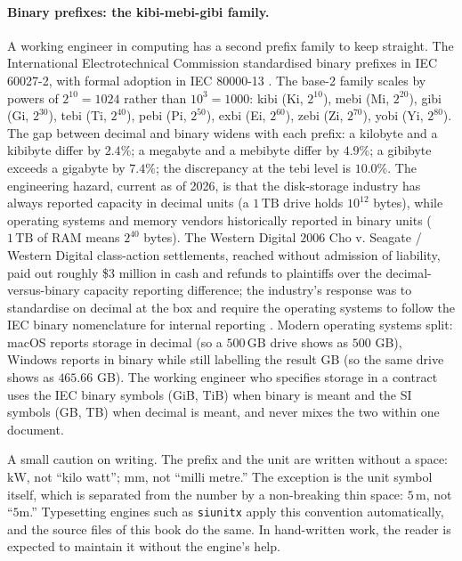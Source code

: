 \paragraph{Binary prefixes: the kibi-mebi-gibi family.}
A working engineer in computing has a second prefix family to keep
straight. The International Electrotechnical Commission standardised
binary prefixes in IEC 60027-2, with formal adoption in IEC 80000-13
\cite{std:ch02t3b-iec-80000-13}. The base-2 family scales by powers
of $2^{10} = 1024$ rather than $10^{3} = 1000$: kibi (Ki, $2^{10}$),
mebi (Mi, $2^{20}$), gibi (Gi, $2^{30}$), tebi (Ti, $2^{40}$), pebi
(Pi, $2^{50}$), exbi (Ei, $2^{60}$), zebi (Zi, $2^{70}$), yobi
(Yi, $2^{80}$). The gap between decimal and binary widens with each
prefix: a kilobyte and a kibibyte differ by $2.4\%$; a megabyte and
a mebibyte differ by $4.9\%$; a gibibyte exceeds a gigabyte by
$7.4\%$; the discrepancy at the tebi level is $10.0\%$. The
engineering hazard, current as of 2026, is that the disk-storage
industry has always reported capacity in decimal units (a
$1 \,\text{TB}$ drive holds $10^{12}$ bytes), while operating
systems and memory vendors historically reported in binary units
($1 \,\text{TB}$ of RAM means $2^{40}$ bytes). The Western Digital
$2006$ Cho v. Seagate / Western Digital class-action settlements,
reached without admission of liability, paid out roughly
\$3 million in cash and refunds to plaintiffs over the
decimal-versus-binary capacity reporting difference; the
industry's response was to standardise on decimal at the box
and require the operating systems to follow the IEC binary
nomenclature for internal reporting \cite{web:ch02t3b-wd-cho-settlement}.
Modern operating systems split: macOS reports
storage in decimal (so a $500 \,\text{GB}$ drive shows as $500$ GB),
Windows reports in binary while still labelling the result GB (so
the same drive shows as $465.66$ GB). The working engineer who
specifies storage in a contract uses the IEC binary symbols (GiB,
TiB) when binary is meant and the SI symbols (GB, TB) when decimal
is meant, and never mixes the two within one document.

A small caution on writing. The prefix and the unit are written
without a space: $\si{\kilo\watt}$, not ``kilo watt'';
$\si{\milli\meter}$, not ``milli metre.'' The exception is the unit
symbol itself, which is separated from the number by a non-breaking
thin space: $5 \,\si{\meter}$, not ``$5\si{\meter}$.''
Typesetting engines such as \texttt{siunitx} apply this convention
automatically, and the source files of this book do the same. In
hand-written work, the reader is expected to maintain it without
the engine's help.

